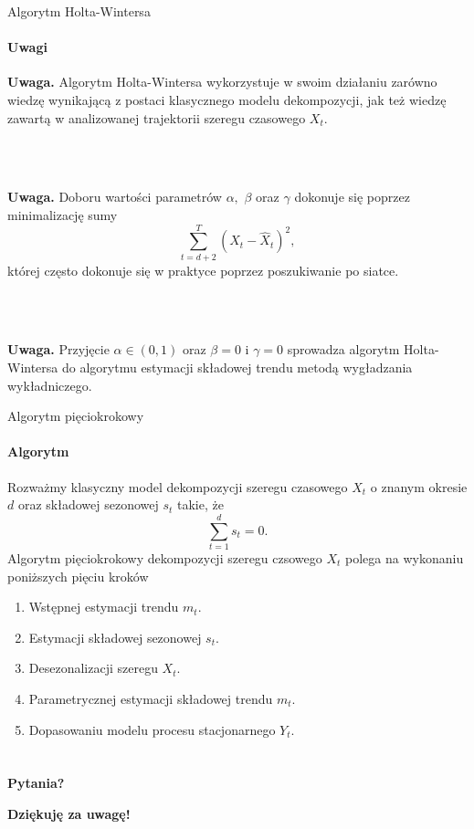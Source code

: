 \documentclass[a4paper, 11pt]{beamer}
\begin{document}
	\begin{frame}{Algorytm Holta-Wintersa}
		\framesubtitle{Uwagi}
		\begin{alert}{\textbf{Uwaga.}}
			Algorytm Holta-Wintersa wykorzystuje w swoim działaniu zarówno wiedzę 
			wynikającą z postaci klasycznego modelu dekompozycji, jak też wiedzę 
			zawartą w analizowanej trajektorii szeregu czasowego $X_t.$
		\end{alert}
		\\~\\
		\begin{alert}{\textbf{Uwaga.}}
			Doboru wartości parametrów $\alpha,$ $\beta$ oraz $\gamma$ dokonuje się
			poprzez minimalizację sumy \[
				\sum_{t=d+2}^{T} \left(X_t - \hat{X}_t\right)^2,
			\] której często dokonuje się w praktyce poprzez poszukiwanie po siatce.
		\end{alert}
		\\~\\
		\begin{alert}{\textbf{Uwaga.}}
			Przyjęcie $\alpha \in \left(0, 1\right)$ oraz $\beta = 0$ i $\gamma = 0$
			sprowadza algorytm Holta-Wintersa do algorytmu estymacji składowej trendu
			metodą wygładzania wykładniczego.
		\end{alert}
	\end{frame}

	\begin{frame}{Algorytm pięciokrokowy}
		\framesubtitle{Algorytm}
		Rozważmy klasyczny model dekompozycji szeregu czasowego $X_t$ o znanym 
		okresie $d$ oraz składowej sezonowej $s_t$ takie, że \[
			\sum_{t=1}^{d} s_t = 0.
		\]
		Algorytm pięciokrokowy dekompozycji szeregu czsowego $X_t$ polega na 
		wykonaniu poniższych pięciu kroków
		\begin{enumerate}
			\item Wstępnej estymacji trendu $m_t.$
			\item Estymacji składowej sezonowej $s_t.$
			\item Desezonalizacji szeregu $X_t$.
			\item Parametrycznej estymacji składowej trendu $m_t.$
			\item Dopasowaniu modelu procesu stacjonarnego $Y_t.$
		\end{enumerate}
	\end{frame}

	\section*{}

	\begin{frame}
		\center
		\Huge \bfseries
		Pytania?
	\end{frame}

	\begin{frame}
		\center
		\Huge \bfseries
		Dziękuję za uwagę!
	\end{frame}
\end{document}
